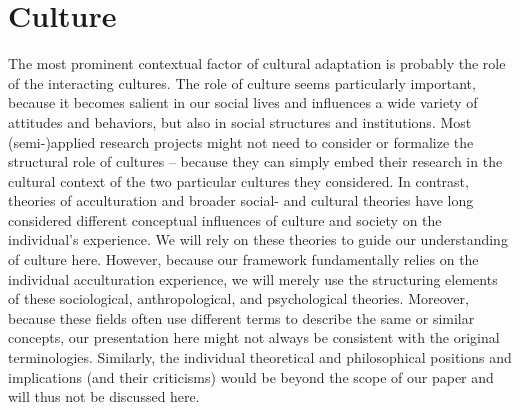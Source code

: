 \documentclass[man, 12pt, a4paper]{apa7}
\begin{document}
\section{Culture} 
The most prominent contextual factor of cultural adaptation is probably the role of the interacting cultures. The role of culture seems particularly important, because it becomes salient in our social lives and influences a wide variety of attitudes and behaviors, but also in social structures and institutions. 
Most (semi-)applied research projects might not need to consider or formalize the structural role of cultures -- because they can simply embed their research in the cultural context of the two particular cultures they considered.
In contrast, theories of acculturation and broader social- and cultural theories have long considered different conceptual influences of culture and society on the individual's experience. We will rely on these theories to guide our understanding of culture here. However, because our framework fundamentally relies on the individual acculturation experience, we will merely use the structuring elements of these sociological, anthropological, and psychological theories. Moreover, because these fields often use different terms to describe the same or similar concepts, our presentation here might not always be consistent with the original terminologies. Similarly, the individual theoretical and philosophical positions and implications (and their criticisms) would be beyond the scope of our paper and will thus not be discussed here.
\end{document}
